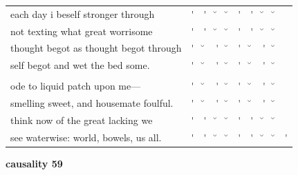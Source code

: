 \documentclass[12pt, landscape]{article}
\begin{document}
\begin{center}
\begin{tabularx}{\textwidth}{
>{\lefting\arraybackslash}X
c
c
c
c
c
c
c
c
c
}

each day i beself stronger through & \'{} & \'{} & \u{} & \u{} & \'{} & \'{} & \u{} & \u{} & \\
not texting what great worrisome & \'{} & \'{} & \u{} & \u{} & \'{} & \'{} & \u{} & \u{} & \\
thought begot as thought begot through & \'{} & \u{} & \'{} & \u{} & \'{} & \u{} & \'{} & \u{} & \\
self begot and wet the bed some. & \'{} & \u{} & \'{} & \u{} & \'{} & \u{} & \'{} & \u{} & \\
 & & & & & & & & \\
ode to liquid patch upon me--- & \'{} & \u{} & \'{} & \u{} & \'{} & \u{} & \'{} & \u{} & \\
smelling sweet, and housemate foulful. & \'{} & \u{} & \'{} & \u{} & \'{} & \u{} & \'{} & \u{} & \\
think now of the great lacking we & \'{} & \'{} & \u{} & \u{} & \'{} & \'{} & \u{} & \u{} & \\
see waterwise: world, bowels, us all. & \'{} & \'{} & \u{} & \u{} & \'{} & \'{} & \u{} & \u{} & \'{} \\

\end{tabularx}
\end{center}

\vspace*{\fill}

\newpage

\vspace*{\fill}

\noindent \textbf{causality 59}
\noindent \hfill \par
\end{document}
